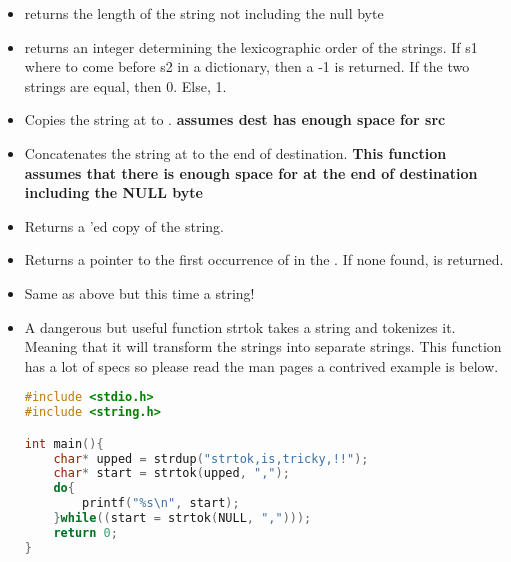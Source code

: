 \begin{itemize}

	\item {} returns the length of the string not including the null byte

	\item {} returns an integer determining the lexicographic order of the strings. If s1 where to come before s2 in a dictionary, then a -1 is returned. If the two strings are equal, then 0. Else, 1.

	\item {} Copies the string at  to . \textbf{assumes dest has enough space for src}

	\item {} Concatenates the string at  to the end of destination. \textbf{This function assumes that there is enough space for  at the end of destination including the NULL byte}

	\item {} Returns a 'ed copy of the string.

	\item {} Returns a pointer to the first occurrence of  in the . If none found,  is returned.

	\item {} Same as above but this time a string!

	\item {}

	      A dangerous but useful function strtok takes a string and tokenizes it. Meaning that it will transform the strings into separate strings. This function has a lot of specs so please read the man pages a contrived example is below.

	      \begin{lstlisting}[language=C]
#include <stdio.h>
#include <string.h>

int main(){
    char* upped = strdup("strtok,is,tricky,!!");
    char* start = strtok(upped, ",");
    do{
        printf("%s\n", start);
    }while((start = strtok(NULL, ",")));
    return 0;
}
\end{lstlisting}


\end{itemize}
